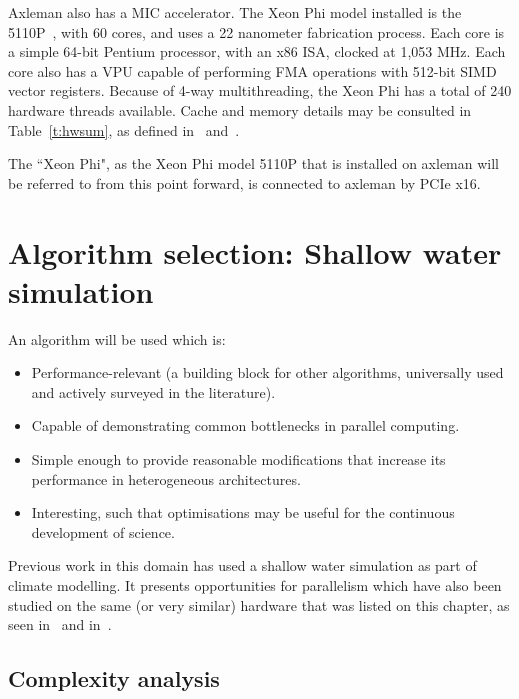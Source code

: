 Axleman also has a MIC accelerator. The Xeon Phi model installed is the 5110P~\cite{3_cpu-world.com_2015}, with 60 cores, and uses a 22 nanometer fabrication process. Each core is a simple 64-bit Pentium processor, with an x86 ISA, clocked at 1,053 MHz. Each core also has a VPU capable of performing FMA operations with 512-bit SIMD vector registers. Because of 4-way multithreading, the Xeon Phi has a total of 240 hardware threads available. Cache and memory details may be consulted in Table~\ref{t:hwsum}, as defined in~\cite{5_intel_ark_productspecs_2015} and~\cite{4_software.intel.com_2012}.

The ``Xeon Phi", as the Xeon Phi model 5110P that is installed on axleman will be referred to from this point forward, is connected to axleman by PCIe x16.

\section{Algorithm selection: Shallow water simulation}

An algorithm will be used which is:
\begin{itemize}

\item Performance-relevant (a building block for other algorithms, universally used and actively surveyed in the literature).

\item Capable of demonstrating common bottlenecks in parallel computing.

\item Simple enough to provide reasonable modifications that increase its performance in heterogeneous architectures.

\item Interesting, such that optimisations may be useful for the continuous development of science.

\end{itemize}

Previous work in this domain has used a shallow water simulation as part of climate modelling. It presents opportunities for parallelism which have also been studied on the same (or very similar) hardware that was listed on this chapter, as seen in~\cite{pappas2012} and in~\cite{Cheng2014}.

\subsection{Complexity analysis}

